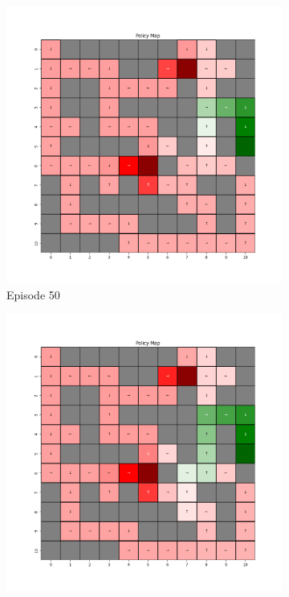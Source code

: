 \documentclass{assignment}
\begin{document}
\begin{figure}[H]
\begin{subfigure}{0.3\textwidth}
        \includegraphics[width=\textwidth]{figures/policy_td/epsilon_sweep/policy_alpha_0.1_gamma_0.95_epsilon_0.0_iteration_50.png}
    \caption{Episode 50}
    \end{subfigure}\hfill
    \begin{subfigure}{0.3\textwidth}
        \includegraphics[width=\textwidth]{figures/policy_td/epsilon_sweep/policy_alpha_0.1_gamma_0.95_epsilon_0.0_iteration_100.png}

\end{subfigure}
\end{figure}
\end{document}
